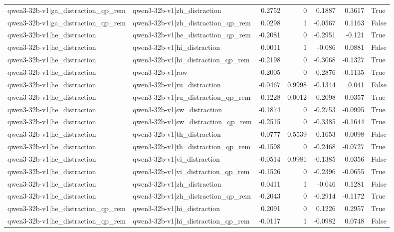 \begin{table}
\begin{tabular}{l l r r r r l}
qwen3-32b-v1|ga_distraction_qp_rem & qwen3-32b-v1|zh_distraction & 0.2752 & 0 & 0.1887 & 0.3617 & True \\
qwen3-32b-v1|ga_distraction_qp_rem & qwen3-32b-v1|zh_distraction_qp_rem & 0.0298 & 1 & -0.0567 & 0.1163 & False \\
qwen3-32b-v1|he_distraction & qwen3-32b-v1|he_distraction_qp_rem & -0.2081 & 0 & -0.2951 & -0.121 & True \\
qwen3-32b-v1|he_distraction & qwen3-32b-v1|hi_distraction & 0.0011 & 1 & -0.086 & 0.0881 & False \\
qwen3-32b-v1|he_distraction & qwen3-32b-v1|hi_distraction_qp_rem & -0.2198 & 0 & -0.3068 & -0.1327 & True \\
qwen3-32b-v1|he_distraction & qwen3-32b-v1|raw & -0.2005 & 0 & -0.2876 & -0.1135 & True \\
qwen3-32b-v1|he_distraction & qwen3-32b-v1|ru_distraction & -0.0467 & 0.9998 & -0.1344 & 0.041 & False \\
qwen3-32b-v1|he_distraction & qwen3-32b-v1|ru_distraction_qp_rem & -0.1228 & 0.0012 & -0.2098 & -0.0357 & True \\
qwen3-32b-v1|he_distraction & qwen3-32b-v1|sw_distraction & -0.1874 & 0 & -0.2753 & -0.0995 & True \\
qwen3-32b-v1|he_distraction & qwen3-32b-v1|sw_distraction_qp_rem & -0.2515 & 0 & -0.3385 & -0.1644 & True \\
qwen3-32b-v1|he_distraction & qwen3-32b-v1|th_distraction & -0.0777 & 0.5539 & -0.1653 & 0.0098 & False \\
qwen3-32b-v1|he_distraction & qwen3-32b-v1|th_distraction_qp_rem & -0.1598 & 0 & -0.2468 & -0.0727 & True \\
qwen3-32b-v1|he_distraction & qwen3-32b-v1|vi_distraction & -0.0514 & 0.9981 & -0.1385 & 0.0356 & False \\
qwen3-32b-v1|he_distraction & qwen3-32b-v1|vi_distraction_qp_rem & -0.1526 & 0 & -0.2396 & -0.0655 & True \\
qwen3-32b-v1|he_distraction & qwen3-32b-v1|zh_distraction & 0.0411 & 1 & -0.046 & 0.1281 & False \\
qwen3-32b-v1|he_distraction & qwen3-32b-v1|zh_distraction_qp_rem & -0.2043 & 0 & -0.2914 & -0.1172 & True \\
qwen3-32b-v1|he_distraction_qp_rem & qwen3-32b-v1|hi_distraction & 0.2091 & 0 & 0.1226 & 0.2957 & True \\
qwen3-32b-v1|he_distraction_qp_rem & qwen3-32b-v1|hi_distraction_qp_rem & -0.0117 & 1 & -0.0982 & 0.0748 & False \\

\end{tabular}
\end{table}
